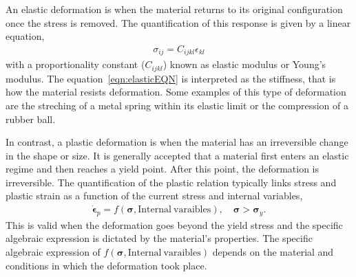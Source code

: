 An elastic deformation is when the material returns to its original configuration once the stress is removed.
The quantification of this response is given by a linear equation,
\begin{gather}
    \sigma_{ij} = C_{ijkl}\epsilon_{kl}\label{eqn:elasticEQN}
\end{gather}
with a proportionality constant ($C_{ijkl}$) known as elastic modulus or Young's modulus.
The equation~\eqref{eqn:elasticEQN} is interpreted as the stiffness, that is how the material resists deformation.
Some examples of this type of deformation are the streching of a metal spring within its elastic limit or the compression of a rubber ball.


In contrast, a plastic deformation is when the material has an irreversible change in the shape or size.
It is generally accepted that a material first enters an elastic regime and then reaches a yield point. 
After this point, the deformation is irreversible.
The quantification of the plastic relation typically links stress and plastic strain as a function of the current stress and internal variables,
\begin{gather}
    \dot{\bm{\epsilon}}_{p} = f\left(\bm{\sigma},\mathrm{Internal~varaibles}\right),\quad\bm{\sigma}>\bm{\sigma}_{y}\label{eqn:plasticEQN}.
\end{gather}
This is valid when the deformation goes beyond the yield stress and the specific algebraic expression is dictated by the material's properties.
The specific algebraic expression of $f\left(\bm{\sigma},\mathrm{Internal~varaibles}\right)$ depends on the material and conditions in which the deformation took place.


